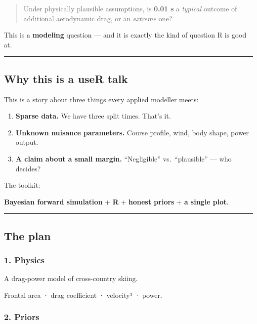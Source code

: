 \documentclass[
  letterpaper,
  DIV=11,
  numbers=noendperiod]{scrartcl}
\providecommand{\tightlist}{%
  \setlength{\itemsep}{0pt}\setlength{\parskip}{0pt}}
\begin{document}
\begin{quote}
Under physically plausible assumptions, is \textbf{0.01 s} a
\emph{typical} outcome of additional aerodynamic drag, or an
\emph{extreme} one?
\end{quote}

This is a \textbf{modeling} question --- and it is exactly the kind of
question R is good at.

\begin{center}\rule{0.5\linewidth}{0.5pt}\end{center}

\subsection{Why this is a useR talk}\label{why-this-is-a-user-talk}

This is a story about three things every applied modeller meets:

\begin{enumerate}
\def\labelenumi{\arabic{enumi}.}
\tightlist
\item
  \textbf{Sparse data.} We have three split times. That's it.
\item
  \textbf{Unknown nuisance parameters.} Course profile, wind, body
  shape, power output.
\item
  \textbf{A claim about a small margin.} ``Negligible''
  vs.~``plausible'' --- who decides?
\end{enumerate}

The toolkit:

\textbf{Bayesian forward simulation} + \textbf{R} + \textbf{honest
priors} + \textbf{a single plot}.

\begin{center}\rule{0.5\linewidth}{0.5pt}\end{center}

\subsection{The plan}\label{the-plan}

\subsubsection{1. Physics}\label{physics}

A drag-power model of cross-country skiing.

Frontal area · drag coefficient · velocity³ · power.

\subsubsection{2. Priors}\label{priors}
\end{document}

